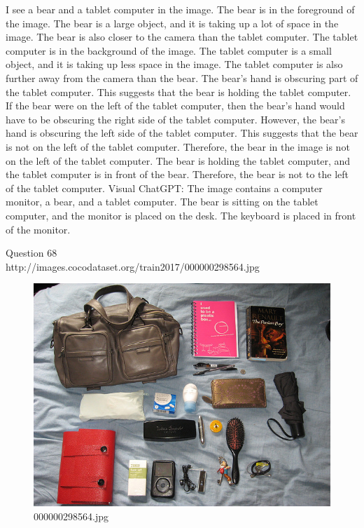 \begin{enumerate}
    I see a bear and a tablet computer in the image.
    The bear is in the foreground of the image. The bear is a large object, and it is taking up a lot of space in the image. The bear is also closer to the camera than the tablet computer.
    The tablet computer is in the background of the image. The tablet computer is a small object, and it is taking up less space in the image. The tablet computer is also further away from the camera than the bear.
    The bear's hand is obscuring part of the tablet computer. This suggests that the bear is holding the tablet computer.
    If the bear were on the left of the tablet computer, then the bear's hand would have to be obscuring the right side of the tablet computer. However, the bear's hand is obscuring the left side of the tablet computer. This suggests that the bear is not on the left of the tablet computer.
    Therefore, the bear in the image is not on the left of the tablet computer. The bear is holding the tablet computer, and the tablet computer is in front of the bear. Therefore, the bear is not to the left of the tablet computer.
    \subitem Visual ChatGPT: The image contains a computer monitor, a bear, and a tablet computer. The bear is sitting on the tablet computer, and the monitor is placed on the desk. The keyboard is placed in front of the monitor.
\end{enumerate}
Question 68\\
http://images.cocodataset.org/train2017/000000298564.jpg
\begin{figure}[h]
    \centering
    \includegraphics[width=0.8\linewidth]{../image set/hard/000000298564.jpg}
    \caption{000000298564.jpg}
\end{figure}
